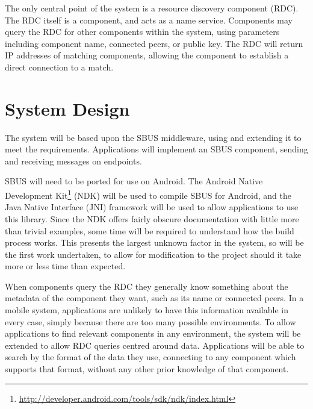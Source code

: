 \documentclass[12pt,twoside,notitlepage]{report}
\begin{document}
The only central point of the system is a resource discovery component (RDC). 
The RDC itself is a component, and acts as a name service. 
Components may query the RDC for other components within the system, using parameters including component name, connected peers, or public key. 
The RDC will return IP addresses of matching components, allowing the component to establish a direct connection to a match.

\section{System Design}

The system will be based upon the SBUS middleware, using and extending it to meet the requirements. 
Applications will implement an SBUS component, sending and receiving messages on endpoints. 

SBUS will need to be ported for use on Android. 
The Android Native Development Kit\footnote{\url{http://developer.android.com/tools/sdk/ndk/index.html}} (NDK) will be used to compile SBUS for Android, and the Java Native Interface (JNI) framework will be used to allow applications to use this library. 
Since the NDK offers fairly obscure documentation with little more than trivial examples, some time will be required to understand how the build process works. 
This presents the largest unknown factor in the system, so will be the first work undertaken, to allow for modification to the project should it take more or less time than expected.

When components query the RDC they generally know something about the metadata of the component they want, such as its name or connected peers. 
In a mobile system, applications are unlikely to have this information available in every case, simply because there are too many possible environments. 
To allow applications to find relevant components in any environment, the system will be extended to allow RDC queries centred around data.
Applications will be able to search by the format of the data they use, connecting to any component which supports that format, without any other prior knowledge of that component.
\end{document}
